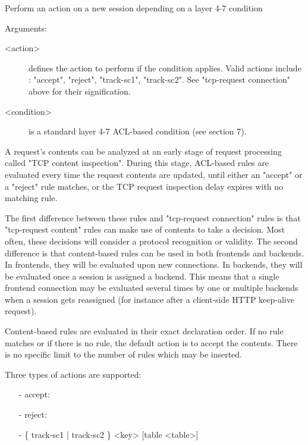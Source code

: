 
  Perform an action on a new session depending on a layer 4-7 condition


  Arguments:
  \begin{description}
  \item[<action>] defines the action to perform if the condition applies. Valid
                actions include : "accept", "reject", "track-sc1", "track-sc2".
                See "tcp-request connection" above for their signification.

  \item[<condition>] is a standard layer 4-7 ACL-based condition (see section 7).
  \end{description}

  A request's contents can be analyzed at an early stage of request processing
  called "TCP content inspection". During this stage, ACL-based rules are
  evaluated every time the request contents are updated, until either an
  "accept" or a "reject" rule matches, or the TCP request inspection delay
  expires with no matching rule.

  The first difference between these rules and "tcp-request connection" rules
  is that "tcp-request content" rules can make use of contents to take a
  decision. Most often, these decisions will consider a protocol recognition or
  validity. The second difference is that content-based rules can be used in
  both frontends and backends. In frontends, they will be evaluated upon new
  connections. In backends, they will be evaluated once a session is assigned
  a backend. This means that a single frontend connection may be evaluated
  several times by one or multiple backends when a session gets reassigned
  (for instance after a client-side HTTP keep-alive request).

  Content-based rules are evaluated in their exact declaration order. If no
  rule matches or if there is no rule, the default action is to accept the
  contents. There is no specific limit to the number of rules which may be
  inserted.

  Three types of actions are supported:
  \begin{itemize}
  \item[-] accept:
  \item[-] reject:
  \item[-] \{ track-sc1 | track-sc2 \} <key> [table <table>]
  \end{itemize}

